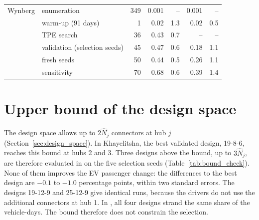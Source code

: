 \begin{table}[htbp]
\begin{tabularx}{\linewidth}{@{}lXrrrrr@{}}
        \addlinespace
        Wynberg     & \MR{} enumeration & 349 & 0.001 & -- & 0.001 & -- \\
                    & \MA{} warm-up (91 days) & 1 & 0.02 & 1.3 & 0.02 & 0.5 \\
                    & \MA{} TPE search & 36 & 0.43 & 0.7 & -- & -- \\
                    & \MA{} validation (selection seeds) & 45 & 0.47 & 0.6 & 0.18 & 1.1 \\
                    & \MA{} fresh seeds & 50 & 0.44 & 0.5 & 0.26 & 1.1 \\
                    & \MA{} sensitivity & 70 & 0.68 & 0.6 & 0.39 & 1.4 \\
        \bottomrule
    \end{tabularx}
\end{table}

\clearpage

\section{Upper bound of the design space}
\label{app:bound_check}

The design space allows up to \(2\hat{N}_j\) connectors at hub \(j\) (Section~\ref{sec:design_space}). In Khayelitsha, the best validated design, 19-8-6, reaches this bound at hubs 2 and 3. Three designs above the bound, up to \(3\hat{N}_j\), are therefore evaluated in \MA{} on the five selection seeds (Table~\ref{tab:bound_check}). None of them improves the EV passenger change: the differences to the best design are $-0.1$ to $-1.0$ percentage points, within two standard errors. The designs 19-12-9 and 25-12-9 give identical runs, because the drivers do not use the additional connectors at hub 1. In \MR, all four designs strand the same share of the vehicle-days. The bound therefore does not constrain the selection.

